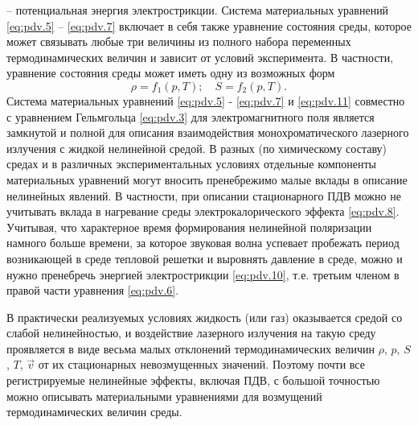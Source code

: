 -- потенциальная энергия электрострикции. Система материальных уравнений \eqref{eq:pdv.5} -- \eqref{eq:pdv.7} включает в себя также уравнение состояния среды, которое может связывать любые три величины из полного набора переменных термодинамических величин и зависит от условий эксперимента. В частности, уравнение состояния среды может иметь одну из возможных форм
\begin{equation}
	\label{eq:pdv.11}
	\rho=f_{1}(p, T) ; \quad S=f_{2}(p, T).
\end{equation}
Система материальных уравнений \eqref{eq:pdv.5} - \eqref{eq:pdv.7} и \eqref{eq:pdv.11} совместно с уравнением Гельмгольца \eqref{eq:pdv.3} для электромагнитного поля является замкнутой и полной для описания взаимодействия монохроматического лазерного излучения с жидкой нелинейной средой. В разных (по химическому составу) средах и в различных экспериментальных условиях отдельные компоненты материальных уравнений могут вносить пренебрежимо малые вклады в описание нелинейных явлений. В частности, при описании стационарного ПДВ можно не учитывать вклада в нагревание среды электрокалорического эффекта \eqref{eq:pdv.8}. Учитывая, что характерное время формирования нелинейной поляризации намного больше времени, за которое звуковая волна успевает пробежать период возникающей в среде тепловой решетки и выровнять давление в среде, можно и нужно пренебречь энергией электрострикции \eqref{eq:pdv.10}, т.е. третьим членом в правой части уравнения \eqref{eq:pdv.6}.

В практически реализуемых условиях жидкость (или газ) оказывается средой со слабой нелинейностью, и воздействие лазерного излучения на такую среду проявляется в виде весьма малых отклонений термодинамических величин $\rho$, $p$, $S$, $T$, $\vec{v}$ от их стационарных невозмущенных значений. Поэтому почти все регистрируемые нелинейные эффекты, включая ПДВ, с большой точностью можно описывать материальными уравнениями для возмущений термодинамических величин среды.


